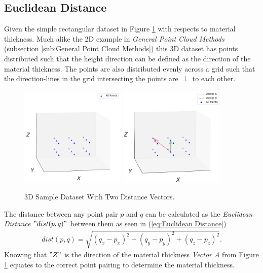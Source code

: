 \documentclass[%
]{USN-MSc}
\begin{document}
\subsection{Euclidean Distance}
\label{sub:Euclidean Distance}
Given the simple rectangular dataset in Figure \ref{fig:Sample Dataset} with respects to material thickness. Much alike the 2D example in \textit{General Point Cloud Methods} (subsection \ref{sub:General Point Cloud Methods}) this 3D dataset has points distributed such that the height direction can be defined as the direction of the material thickness. The points are also distributed evenly across a grid such that the direction-lines in the grid intersecting the points are \(\perp\) to each other.
\begin{figure}[H]
    \centering
    \includegraphics[width=0.45\textwidth]{fig/Sample Data-set.png}
    \includegraphics[width=0.45\textwidth]{fig/Sample Data-Set Random Points vectors.png}
    \caption{3D Sample Dataset With Two Distance Vectors.}
    \label{fig:Sample Dataset}
\end{figure}
The distance between any point pair $p$ and $q$ can be calculated as the \textit{Euclidean Distance} \("dist(p,q)"\) between them as seen in (\ref{eq:Euclidean Distance})
\begin{align}
    \label{eq:Euclidean Distance}
    dist(p,q) = \sqrt{(q_x-p_x)^2+(q_y-p_y)^2+(q_z-p_z)^2}.
\end{align}
Knowing that \("Z"\) is the direction of the material thickness \textit{Vector A} from Figure \ref{fig:Sample Dataset} equates to the correct point pairing to determine the material thickness.
\end{document}
